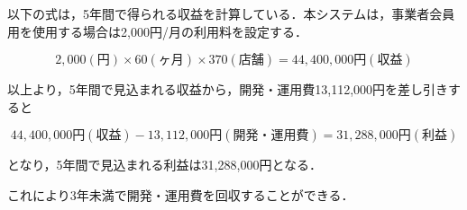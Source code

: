 以下の式は，5年間で得られる収益を計算している．本システムは，事業者会員用を使用する場合は2,000円/月の利用料を設定する．

\[2,000(円)\times 60(ヶ月)\times 370(店舗)=44,400,000円(収益)\]

以上より，5年間で見込まれる収益から，開発・運用費13,112,000円を差し引きすると

\[44,400,000円(収益)-13,112,000円(開発・運用費)=31,288,000円(利益)\]

となり，5年間で見込まれる利益は31,288,000円となる．

これにより3年未満で開発・運用費を回収することができる．









